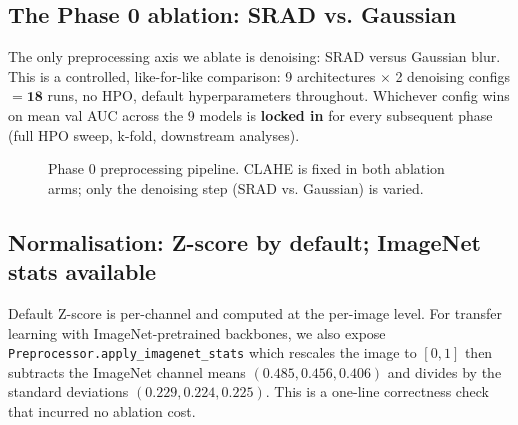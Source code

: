 \documentclass[10pt,a4paper]{article}
\begin{document}
\subsection{The Phase 0 ablation: SRAD vs. Gaussian}

The only preprocessing axis we ablate is denoising: SRAD versus
Gaussian blur. This is a controlled, like-for-like comparison:
9 architectures $\times$ 2 denoising configs $= \mathbf{18}$ runs,
no HPO, default hyperparameters throughout. Whichever config wins on
mean val AUC across the 9 models is \textbf{locked in} for every
subsequent phase (full HPO sweep, k-fold, downstream analyses).

\begin{figure}[ht]
  \centering
  \caption{Phase 0 preprocessing pipeline. CLAHE is fixed in both
    ablation arms; only the denoising step (SRAD vs. Gaussian) is
    varied.}
  \label{fig:preproc}
\end{figure}

\subsection{Normalisation: Z-score by default; ImageNet stats available}

Default Z-score is per-channel and computed at the per-image level.
For transfer learning with ImageNet-pretrained backbones, we also
expose \texttt{Preprocessor.apply\_imagenet\_stats} which rescales
the image to $[0, 1]$ then subtracts the ImageNet channel means
$(0.485, 0.456, 0.406)$ and divides by the standard deviations
$(0.229, 0.224, 0.225)$. This is a one-line correctness check that
incurred no ablation cost.
\end{document}
